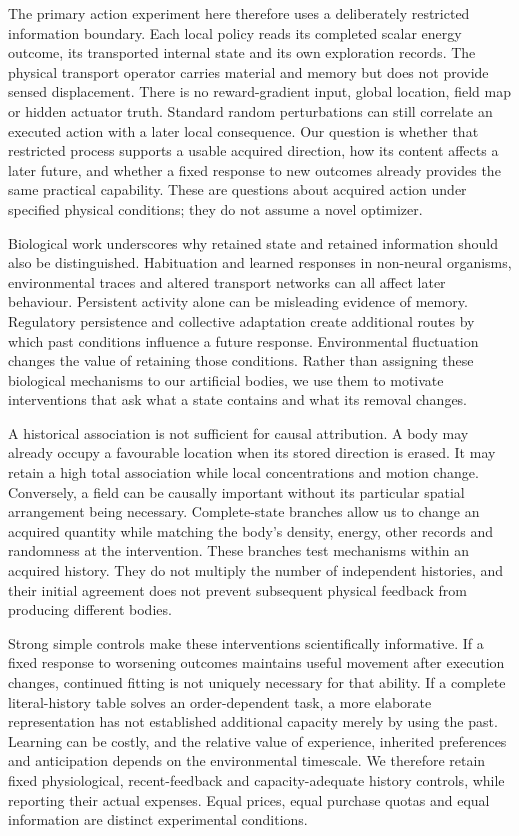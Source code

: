 The primary action experiment here therefore uses a deliberately restricted information boundary. Each local policy reads its completed scalar energy outcome, its transported internal state and its own exploration records. The physical transport operator carries material and memory but does not provide sensed displacement. There is no reward-gradient input, global location, field map or hidden actuator truth. Standard random perturbations can still correlate an executed action with a later local consequence. Our question is whether that restricted process supports a usable acquired direction, how its content affects a later future, and whether a fixed response to new outcomes already provides the same practical capability. These are questions about acquired action under specified physical conditions; they do not assume a novel optimizer.

Biological work underscores why retained state and retained information should also be distinguished. Habituation and learned responses in non-neural organisms, environmental traces and altered transport networks can all affect later behaviour\cite{boisseau,reid,kramar2021,vogel,boussard}. Persistent activity alone can be misleading evidence of memory\cite{reiber}. Regulatory persistence and collective adaptation create additional routes by which past conditions influence a future response\cite{acar,micheelsen,yang}. Environmental fluctuation changes the value of retaining those conditions\cite{lambert}. Rather than assigning these biological mechanisms to our artificial bodies, we use them to motivate interventions that ask what a state contains and what its removal changes.

A historical association is not sufficient for causal attribution. A body may already occupy a favourable location when its stored direction is erased. It may retain a high total association while local concentrations and motion change. Conversely, a field can be causally important without its particular spatial arrangement being necessary. Complete-state branches allow us to change an acquired quantity while matching the body's density, energy, other records and randomness at the intervention. These branches test mechanisms within an acquired history. They do not multiply the number of independent histories, and their initial agreement does not prevent subsequent physical feedback from producing different bodies.

Strong simple controls make these interventions scientifically informative. If a fixed response to worsening outcomes maintains useful movement after execution changes, continued fitting is not uniquely necessary for that ability. If a complete literal-history table solves an order-dependent task, a more elaborate representation has not established additional capacity merely by using the past. Learning can be costly\cite{mery2005}, and the relative value of experience, inherited preferences and anticipation depends on the environmental timescale\cite{dunlap2009,mitchell,tagkopoulos}. We therefore retain fixed physiological, recent-feedback and capacity-adequate history controls, while reporting their actual expenses. Equal prices, equal purchase quotas and equal information are distinct experimental conditions.

